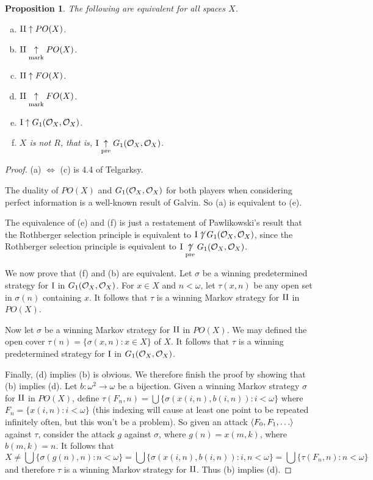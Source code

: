 \documentclass{amsart}
\theoremstyle{plain}
\newtheorem{proposition}[theorem]{Proposition}
\theoremstyle{definition}
\theoremstyle{remark}
\theoremstyle{plain}
\theoremstyle{definition}
\theoremstyle{remark}
\begin{document}
\begin{proposition}
 The following are equivalent for all spaces \(X\).
 \begin{enumerate}[a)]
  \item \(\mathrm{II}\uparrow PO(X)\).
  \item \(\mathrm{II}\underset{\text{mark}}{\uparrow} PO(X)\).
  \item \(\mathrm{II}\uparrow FO(X)\).
  \item \(\mathrm{II}\underset{\text{mark}}{\uparrow} FO(X)\).
  \item \(\mathrm{I}\uparrow G_1(\mathcal{O}_{X},\mathcal{O}_{X})\).
  \item \(X\) is not \(R\), that is, \(\mathrm{I}\underset{\text{pre}}{\uparrow} G_1(\mathcal{O}_{X},\mathcal{O}_{X})\).
 \end{enumerate}
\end{proposition}
\begin{proof}
 (a) \(\Leftrightarrow\) (c) is 4.4 of Telgarksy\cite{Telgársky1975}.

 The duality of \(PO(X)\) and \(G_1(\mathcal{O}_{X},\mathcal{O}_{X})\) for both players when considering perfect information is a well-known result of Galvin\cite{Galvin}. 
 So (a) is equivalent to (e).

 The equivalence of (e) and (f) is just a restatement of Pawlikowski's result that the Rothberger selection principle is equivalent to \(\mathrm{I}\not\uparrow G_1(\mathcal{O}_{X},\mathcal{O}_{X})\)\cite{Pawlikowski}, since the Rothberger selection principle is equivalent to \(\mathrm{I}\underset{\text{pre}}{\not\uparrow}G_1(\mathcal{O}_{X},\mathcal{O}_{X})\).

 We now prove that (f) and (b) are equivalent.
 Let \(\sigma\) be a winning predetermined strategy for \(\mathrm{I}\) in \(G_1(\mathcal{O}_{X},\mathcal{O}_{X})\).
 For \(x\in X\) and \(n<\omega\), let \(\tau(x,n)\) be any open set in \(\sigma(n)\) containing \(x\). 
 It follows that \(\tau\) is a winning Markov strategy for \(\mathrm{II}\) in \(PO(X)\).

 Now let \(\sigma\) be a winning Markov strategy for \(\mathrm{II}\) in \(PO(X)\).
 We may defined the open cover \(\tau(n)=\{\sigma(x,n):x\in X\}\) of \(X\).
 It follows that \(\tau\) is a winning predetermined strategy for \(\mathrm{I}\) in \(G_1(\mathcal{O}_{X},\mathcal{O}_{X})\).

 Finally, (d) implies (b) is obvious.
 We therefore finish the proof by showing that (b) implies (d).
 Let \(b:\omega^2\to\omega\) be a bijection.
 Given a winning Markov strategy \(\sigma\) for \(\mathrm{II}\) in \(PO(X)\), define \(\tau(F_n,n)=\bigcup\{\sigma(x(i,n),b(i,n)):i<\omega\}\) where \(F_n=\{x(i,n):i<\omega\}\) (this indexing will cause at least one point to be repeated infinitely often, but this won't be a problem). 
 So given an attack \(\<F_0,F_1,\dots\>\) against \(\tau\), consider the attack \(g\) against \(\sigma\), where \(g(n)=x(m,k)\), where \(b(m,k) = n\). 
 It follows that
 \[
   X \not= \bigcup\{\sigma(g(n),n):n<\omega\} = \bigcup\{\sigma(x(i,n),b(i,n)):i,n<\omega\} = \bigcup\{\tau(F_n,n):n<\omega\}
 \]
 and therefore \(\tau\) is a winning Markov strategy for \(\mathrm{II}\).
 Thus (b) implies (d).
\end{proof}
\end{document}
